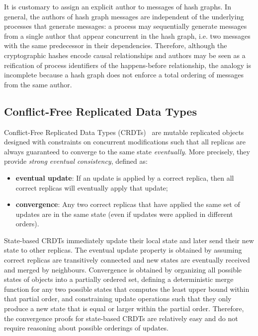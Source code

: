 \documentclass[9pt, oneside]{article}   	%
\begin{document}
It is customary to assign an explicit author to messages of hash graphs. In general, the authors of hash graph messages are independent of the underlying processes that generate messages: a process may sequentially generate messages from a single author that appear concurrent in the hash graph, i.e. two messages with the same predecessor in their dependencies. Therefore, although the cryptographic hashes encode causal relationships and authors may be seen as a reification of process identifiers of the happens-before relationship, the analogy is incomplete because a hash graph does not enforce a total ordering of messages from the same author.

\subsection{Conflict-Free Replicated Data Types}
\label{sec:background:crdt}

Conflict-Free Replicated Data Types (CRDTs)~\cite{Shapiro2011CRDTs}  are mutable replicated objects designed with constraints on concurrent modifications such that all replicas are always guaranteed to converge to the same state \textit{eventually}. More precisely, they provide \textit{strong eventual consistency}, defined as:
\begin{itemize}
	\item \textbf{eventual update}: If an update is applied by a correct replica, then all correct replicas will eventually apply that update;
	\item \textbf{convergence}: Any two correct replicas that have applied the same set of updates are in the same state (even if updates were applied in different orders).
\end{itemize} 

State-based CRDTs immediately update their local state and later send their new state to other replicas. The eventual update property is obtained by assuming correct replicas are transitively connected and new states are eventually received and merged by neighbours. Convergence is obtained by organizing all possible states of objects into a partially ordered set, defining a deterministic merge function for any two possible states that computes the least upper bound within that partial order, and constraining update operations such that they only produce a new state that is equal or larger within the partial order. Therefore, the convergence proofs for state-based CRDTs are relatively easy and do not require reasoning about possible orderings of updates.
\end{document}
